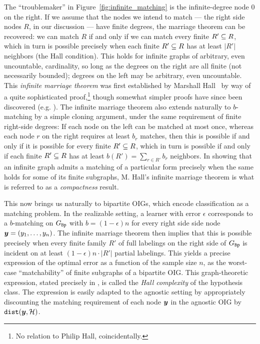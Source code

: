 The ``troublemaker'' in Figure~\ref{fig:infinite_matching} is the infinite-degree node $0$ on the right. If we assume that the nodes we intend to match --- the right side nodes $R$, in our discussion --- have finite degrees, the marriage theorem can be recovered:  we can match  $R$ if and only if we can match every finite $R' \subseteq R$, which in turn is possible precisely when each finite $R' \subseteq R$ has at least $|R'|$ neighbors (the Hall condition). This holds for infinite graphs of arbitrary, even uncountable, cardinality, so long as the degrees on the right are all finite (not necessarily bounded); degrees on the left may be arbitrary, even uncountable. This \emph{infinite marriage theorem} was first established by Marshall Hall~\cite{jr_distinct_1948} by way of a quite sophisticated proof,\footnote{No relation to Philip Hall, coincidentally.}  though somewhat simpler proofs have since been discovered (e.g. \cite{halmos_marriage_1950,rado_note_1967}). The infinite marriage theorem also extends naturally to  $b$-matching by a simple cloning argument, under the same requirement of finite right-side degrees: If each node on the left can be matched at most once, whereas each node $r$ on the right requires at least $b_r$ matches, then this is possible if and only if it is possible for every finite $R' \subseteq R$, which in turn is possible if and only if each finite $R' \subseteq R$ has at least $b(R') = \sum_{r \in R'} b_r$ neighbors. In showing that an infinite graph admits a matching of a particular form precisely when the same holds for some of its finite subgraphs, M. Hall's infinite marriage theorem is what is referred to as a \emph{compactness} result.

This now brings us naturally to bipartite OIGs, which encode classification as a matching problem. In the realizable setting, a learner with error $\epsilon$ corresponds to a $b$-matching on $G_{\mathtt{Bp}}$ with $b=(1-\epsilon)n$ for every right side side node $\boldsymbol{ y }=(y_1, \ldots, y_n)$. The infinite marriage theorem then implies that this is possible precisely when every finite family $R'$ of full labelings on the right side of $G_{\mathtt{Bp}}$ is incident on at least $(1-\epsilon)n \cdot |R'|$ partial labelings. This yields a precise expression of the optimal error as a function of the sample size $n$,  as the worst-case  ``matchability'' of finite subgraphs of a bipartite OIG. This graph-theoretic expression, stated precisely in \cite{asilis_regularization_2024}, is called the \emph{Hall complexity} of the hypothesis class. The expression is easily adapted to the agnostic setting by appropriately discounting the matching requirement of each node $\boldsymbol{ y }$ in the agnostic OIG by $\mathtt{dist}(\boldsymbol{ y },\mathcal{H})$. 

